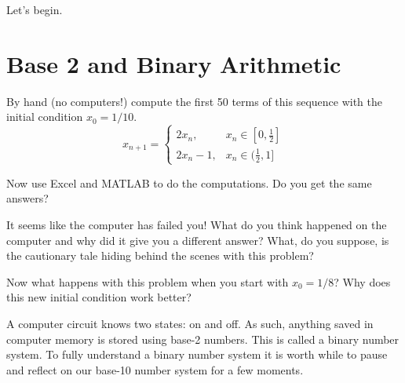 \begin{center}
    Let's begin.
\end{center}
\section{Base 2 and Binary Arithmetic}
\begin{problem}\label{prob:base_10_faila}
    By hand (no computers!) compute the first 50 terms of this sequence with the initial condition $x_0 = 1/10$.
    \[ x_{n+1} = \left\{ \begin{array}{ll} 2x_n, & x_n \in [0,\frac{1}{2}] \\ 2x_n - 1, & x_n \in (\frac{1}{2},1] \end{array} \right. \]
    \end{problem}
\solution{
\[ x_n = \{1/10, 2/10, 4/10, 8/10, 6/10, 2/10, 4/10, 8/10, 6/10, \ldots \} \]
}

\begin{problem}\label{prob:base_10_failb}
Now use Excel and MATLAB to do the computations.  Do you get the same answers?  
\end{problem}

\begin{problem}\label{prob:base_10_failc}
It seems like the computer has failed you!   What do you think happened on the computer
and why did it give you a different answer?  What, do you suppose, is the cautionary tale hiding behind the scenes with this problem?
\end{problem}

\begin{problem}
    Now what happens with this problem when you start with $x_0 = 1/8$?  Why does this new
    initial condition work better?
\end{problem}

A computer circuit knows two states: on and off.  As such, anything saved in computer
memory is stored using base-2 numbers.  This is called a binary number system.  To fully
understand a binary number system it is worth while to pause and reflect on our base-10
number system for a few moments. 

